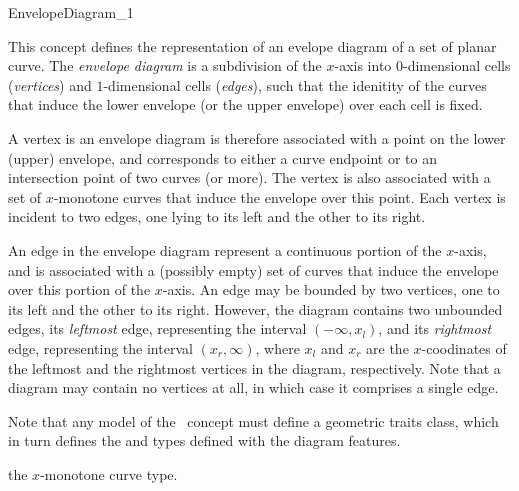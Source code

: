 
\ccRefPageBegin

\begin{ccRefConcept}{EnvelopeDiagram_1}

\ccDefinition

This concept defines the representation of an evelope diagram of a set
of planar curve. The {\em envelope diagram} is a subdivision of the $x$-axis
into $0$-dimensional cells ({\em vertices}) and $1$-dimensional cells
({\em edges}), such that the idenitity of the curves that induce the lower
envelope (or the upper envelope) over each cell is fixed.

A vertex is an envelope diagram is therefore associated with a point
on the lower (upper) envelope, and corresponds to either a curve endpoint
or to an intersection point of two curves (or more). The vertex is also
associated with a set of $x$-monotone curves that induce the envelope
over this point. Each vertex is incident to two edges, one lying to its
left and the other to its right.

An edge in the envelope diagram represent a continuous portion of the
$x$-axis, and is associated with a (possibly empty) set of curves that
induce the envelope over this portion of the $x$-axis. An edge may be bounded
by two vertices, one to its left and the other to its right. However, the
diagram contains two unbounded edges, its {\em leftmost} edge, representing
the interval $(-\infty, x_l)$, and its {\em rightmost} edge, representing the
interval $(x_r, \infty)$, where $x_l$ and $x_r$ are the $x$-coodinates of
the leftmost and the rightmost vertices in the diagram, respectively.
Note that a diagram may contain no vertices at all, in which case it
comprises a single edge.

Note that any model of the \ccRefName\ concept must define a geometric
traits class, which in turn defines the  and 
 types defined with the diagram features.

\ccTypes


\ccGlue
{}
{the $x$-monotone curve type.}


\end{ccRefConcept}
